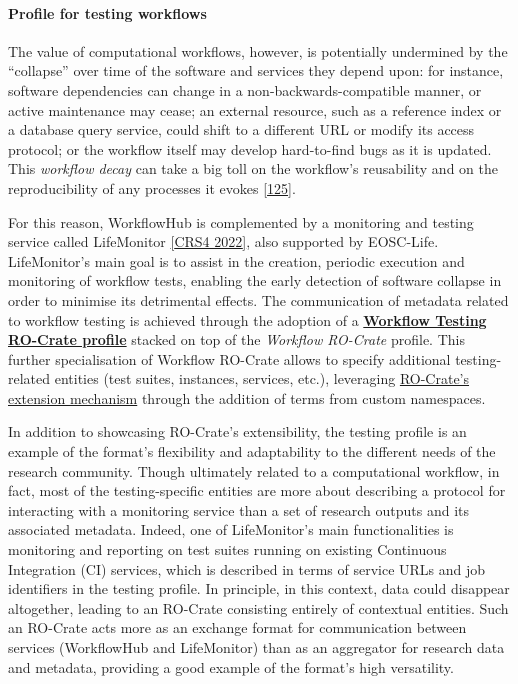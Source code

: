 \hypertarget{profile-for-testing-workflows}{%
\paragraph{Profile for testing
workflows}\label{profile-for-testing-workflows}}

The value of computational workflows, however, is potentially undermined
by the ``collapse'' over time of the software and services they depend
upon: for instance, software dependencies can change in a
non-backwards-compatible manner, or active maintenance may cease; an
external resource, such as a reference index or a database query
service, could shift to a different URL or modify its access protocol;
or the workflow itself may develop hard-to-find bugs as it is updated.
This \emph{workflow decay} can take a big toll on the workflow's
reusability and on the reproducibility of any processes it evokes
{[}\href{https://www.research.manchester.ac.uk/portal/files/174861334/why_decay.pdf}{125}{]}.

For this reason, WorkflowHub is complemented by a monitoring and testing
service called LifeMonitor
\href{https://about.lifemonitor.eu/}{{[}CRS4 2022{]}}, also supported by
EOSC-Life. LifeMonitor's main goal is to assist in the creation,
periodic execution and monitoring of workflow tests, enabling the early
detection of software collapse in order to minimise its detrimental
effects. The communication of metadata related to workflow testing is
achieved through the adoption of a
\href{https://lifemonitor.eu/workflow_testing_ro_crate}{\textbf{Workflow
Testing RO-Crate profile}} stacked on top of the \emph{Workflow
RO-Crate} profile. This further specialisation of Workflow RO-Crate
allows to specify additional testing-related entities (test suites,
instances, services, etc.), leveraging
\href{https://www.researchobject.org/ro-crate/1.1/appendix/jsonld.html\#extending-ro-crate}{RO-Crate's
extension mechanism} through the addition of terms from custom
namespaces.

In addition to showcasing RO-Crate's extensibility, the testing profile
is an example of the format's flexibility and adaptability to the
different needs of the research community. Though ultimately related to
a computational workflow, in fact, most of the testing-specific entities
are more about describing a protocol for interacting with a monitoring
service than a set of research outputs and its associated metadata.
Indeed, one of LifeMonitor's main functionalities is monitoring and
reporting on test suites running on existing Continuous Integration (CI)
services, which is described in terms of service URLs and job
identifiers in the testing profile. In principle, in this context, data
could disappear altogether, leading to an RO-Crate consisting entirely
of contextual entities. Such an RO-Crate acts more as an exchange format
for communication between services (WorkflowHub and LifeMonitor) than as
an aggregator for research data and metadata, providing a good example
of the format's high versatility.

